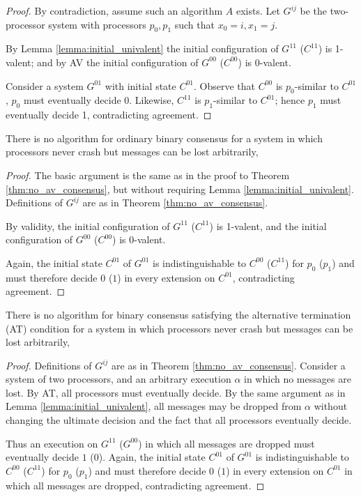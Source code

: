 \begin{proof}
By contradiction, assume such an algorithm $A$ exists.
Let $G^{ij}$ be the two-processor system with processors
$p_0, p_1$ such that $x_0 = i, x_1 = j$.

By Lemma \ref{lemma:initial_univalent} the initial configuration of
$G^{11}$ ($C^{11}$) is 1-valent; and by AV the initial configuration
of $G^{00}$ ($C^{00}$) is 0-valent.

Consider a system $G^{01}$ with initial state $C^{01}$.
Observe that $C^{00}$ is $p_0$-similar to $C^{01}$, $p_0$ must eventually decide 0.
Likewise, $C^{11}$ is $p_1$-similar to $C^{01}$; hence $p_1$ must eventually
decide 1, contradicting agreement.
\end{proof}

\begin{theorem}
There is no algorithm for ordinary binary consensus
for a system in which processors never crash but messages can be
lost arbitrarily,
\end{theorem}

\begin{proof}
The basic argument is the same as in the proof to Theorem \ref{thm:no_av_consensus},
but without requiring Lemma \ref{lemma:initial_univalent}. Definitions of
$G^{ij}$ are as in Theorem \ref{thm:no_av_consensus}.

By validity, the initial configuration of
$G^{11}$ ($C^{11}$) is 1-valent, and the initial configuration
of $G^{00}$ ($C^{00}$) is 0-valent.

Again, the initial state $C^{01}$ of $G^{01}$ is indistinguishable to $C^{00}$
($C^{11}$) for $p_0$ ($p_1$) and must therefore decide $0$ ($1$) in every extension
on $C^{01}$, contradicting agreement.
\end{proof}

\begin{theorem} \label{thm:no_at_consensus}
There is no algorithm for binary consensus satisfying the alternative termination (AT)
condition for a system in which processors never crash but messages can be
lost arbitrarily,
\end{theorem}

\begin{proof}
Definitions of
$G^{ij}$ are as in Theorem \ref{thm:no_av_consensus}.
Consider a system of two processors, and an arbitrary execution $\alpha$ in which
no messages are lost. By AT, all processors must eventually decide. By the same
argument as in Lemma \ref{lemma:initial_univalent}, all messages may be dropped
from $\alpha$ without changing the ultimate decision and the fact that all
processors eventually decide.

Thus an execution on $G^{11}$ ($G^{00}$) in which all messages are dropped must eventually 
decide $1$ ($0$).
Again, the initial state $C^{01}$ of $G^{01}$ is indistinguishable to $C^{00}$
($C^{11}$) for $p_0$ ($p_1$) and must therefore decide $0$ ($1$) in every extension
on $C^{01}$ in which all messages are dropped, contradicting agreement.
\end{proof}

